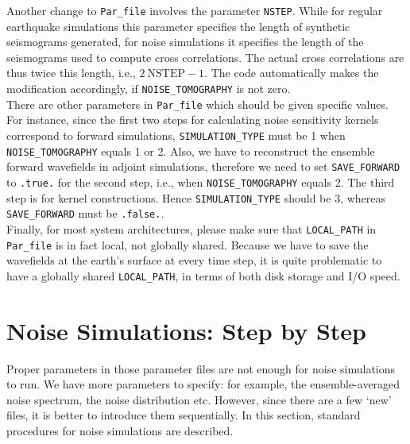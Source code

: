Another change to \texttt{Par\_file} involves the parameter \texttt{NSTEP}.
While for regular earthquake simulations this parameter specifies
the length of synthetic seismograms generated, for noise simulations
it specifies the length of the seismograms used to compute cross correlations.
The actual cross correlations are thus twice this length, i.e., $2~\mathrm{NSTEP}-1$.
The code automatically makes the modification accordingly, if \texttt{NOISE\_TOMOGRAPHY}
is not zero.\\


There are other parameters in \texttt{Par\_file} which should be given
specific values. For instance, since the first two steps for calculating
noise sensitivity kernels correspond to forward simulations, \texttt{SIMULATION\_TYPE}
must be 1 when \texttt{NOISE\_TOMOGRAPHY} equals 1 or 2. Also, we
have to reconstruct the ensemble forward wavefields in adjoint simulations,
therefore we need to set \texttt{SAVE\_FORWARD} to \texttt{.true.}
for the second step, i.e., when \texttt{NOISE\_TOMOGRAPHY} equals
2. The third step is for kernel constructions. Hence \texttt{SIMULATION\_TYPE}
should be 3, whereas \texttt{SAVE\_FORWARD} must be \texttt{.false.}.\\


Finally, for most system architectures, please make sure that \texttt{LOCAL\_PATH}
in \texttt{Par\_file} is in fact local, not globally shared. Because
we have to save the wavefields at the earth's surface at every time
step, it is quite problematic to have a globally shared \texttt{LOCAL\_PATH},
in terms of both disk storage and I/O speed.


\section{Noise Simulations: Step by Step}

Proper parameters in those parameter files are not enough for noise
simulations to run. We have more parameters to specify: for example,
the ensemble-averaged noise spectrum, the noise distribution etc.
However, since there are a few `new' files, it is better to introduce
them sequentially. In this section, standard procedures for noise
simulations are described.


